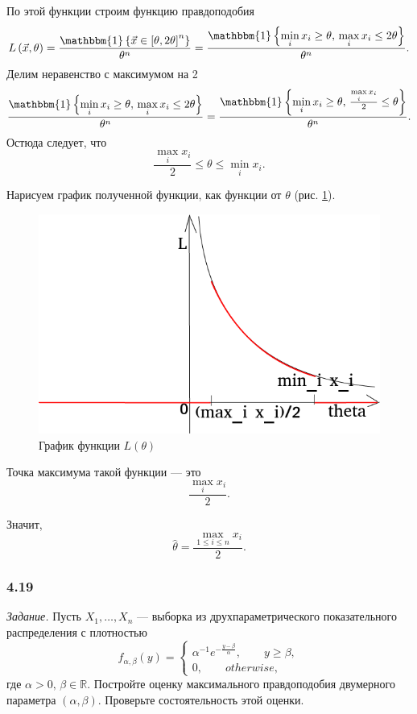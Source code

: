 \begin{enumerate}[label=\alph*)]
  По этой функции строим функцию правдоподобия
  $$L \left( \vec{x}, \theta \right) =
    \frac{ \mathbbm{1} \left\{ \vec{x} \in \left[ \theta, 2 \theta \right]^n \right\} }{ \theta^n} =
    \frac{ \mathbbm{1} \left\{ \min \limits_i x_i \geq \theta, \, \max \limits_i x_i \leq 2 \theta \right\} }{ \theta^n}.$$
  Делим неравенство с максимумом на 2
  $$ \frac{ \mathbbm{1} \left\{ \min \limits_i x_i \geq \theta, \, \max \limits_i x_i \leq 2 \theta \right\} }{ \theta^n} =
    \frac{ \mathbbm{1} \left\{ \min \limits_i x_i \geq \theta,\, \frac{ \max \limits_i x_i}{2} \leq \theta \right\} }{ \theta^n}.$$
  Остюда следует, что
  $$ \frac{ \max \limits_i x_i}{2} \leq
    \theta \leq
    \min \limits_i x_i.$$

  Нарисуем график полученной функции, как функции от $ \theta $ (рис. \ref{fig:4183}).

  \begin{figure}[h!]
    \centering
    \includegraphics[width=.4\textwidth]{./pictures/4_18_3.png}
    \caption{График функции $L \left( \theta \right) $}
    \label{fig:4183}
  \end{figure}

  Точка максимума такой функции --- это
  $$ \frac{ \max \limits_i x_i}{2}.$$

  Значит,
  $$ \hat{ \theta } =
    \frac{ \max \limits_{1 \leq i \leq n} x_i}{2}.$$
\end{enumerate}

\subsubsection*{4.19}

\textit{Задание.}
Пусть $X_1, \dotsc, X_n$ ---
выборка из друхпараметрического показательного распределения с плотностью
$$f_{ \alpha, \beta } \left( y \right) =
  \begin{cases}
    \alpha^{-1} e^{- \frac{y - \beta }{ \alpha }}, \qquad y \geq \beta, \\
    0, \qquad otherwise,
  \end{cases}$$
где $ \alpha > 0, \, \beta \in \mathbb{R}$.
Постройте оценку максимального правдоподобия двумерного параметра $ \left( \alpha, \beta \right) $.
Проверьте состоятельность этой оценки.

